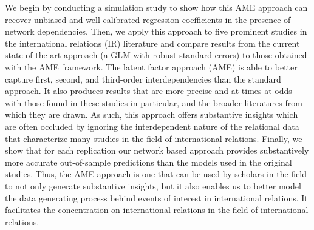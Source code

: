 We begin by conducting a simulation study to show how this AME approach can recover unbiased and well-calibrated regression coefficients in the presence of network dependencies. Then, we apply this approach to five prominent studies in the international relations (IR) literature and compare results from the current state-of-the-art approach (a GLM with robust standard errors) to those obtained with the AME framework. The latent factor approach (AME) is able to better capture first, second, and third-order interdependencies than the standard approach. It also produces results that are more precise and at times at odds with those found in these studies in particular, and the broader literatures from which they are drawn. As such, this approach offers substantive insights which are often occluded by ignoring the interdependent nature of the relational data that characterize many studies in the field of international relations. Finally, we show that for each replication our network based approach provides substantively more accurate out-of-sample predictions than the models used in the original studies. Thus, the AME approach is one that can be used by scholars in the field to not only generate substantive insights, but it also enables us to better model the data generating process behind events of interest in international relations.  It facilitates the concentration on international relations in the field of international relations.